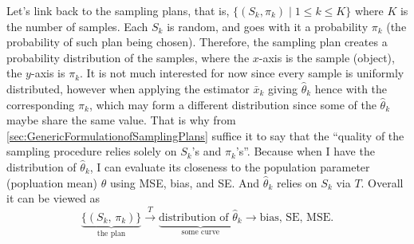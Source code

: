 Let's link back to the sampling plans, that is, $\{(S_k,\pi_k)\mid 1\leq k\leq K\}$ where $K$ is the number of samples. Each $S_k$ is random, and goes with it a probability $\pi_k$ (the probability of such plan being chosen). Therefore, 
the sampling plan creates a probability distribution of the samples, where the $x$-axis is the sample (object), the $y$-axis is $\pi_k$. It is not much interested for now since every sample is uniformly distributed, however when applying the 
estimator $\bar{x}_k$ giving $\hat{\theta}_k$ hence with the corresponding $\pi_k$, which may form a different distribution since some of the $\hat{\theta}_k$ maybe share the same value. That is why from 
\cref{sec:GenericFormulationofSamplingPlans} suffice it to say that the ``quality of the sampling procedure relies solely on $S_k$'s and $\pi_k$'s''. Because when I have the distribution of $\hat{\theta}_k$, I can evaluate its closeness to the 
population parameter (popluation mean) $\theta$ using MSE, bias, and SE. And $\hat{\theta}_k$ relies on $S_k$ via $T$. Overall it can be viewed as
\begin{equation}
    \underbrace{\{(S_k,\, \pi_k)\}}_{\text{the plan}}
    \xrightarrow{\;T\;}
    \underbrace{\text{distribution of } \hat{\theta}_k}_{\text{some curve}}
    \longrightarrow
    \text{bias, SE, MSE.}
\end{equation}
